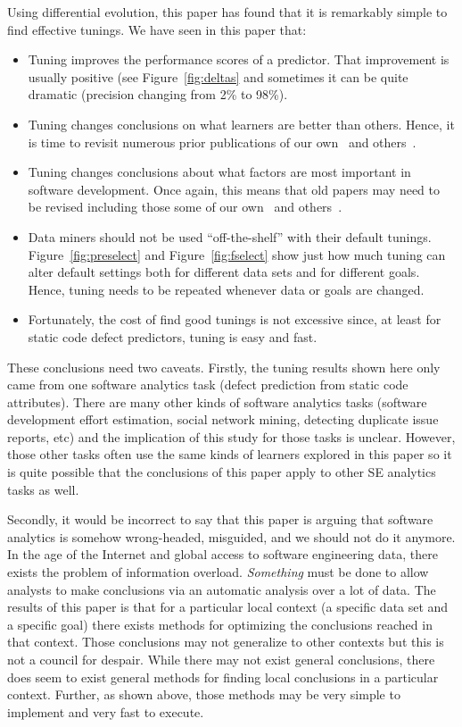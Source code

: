 \documentclass{sig-alternative}
\newcommand{\bi}{\begin{itemize}[leftmargin=0.4cm]}
\newcommand{\ei}{\end{itemize}}
\newcommand{\fig}[1]{Figure~\ref{fig:#1}}
\begin{document}
Using differential evolution, this paper has found that it is remarkably simple to find effective tunings. We have seen in this paper that:
\bi
\item
Tuning improves the performance scores of a predictor.
That improvement is usually positive (see \fig{deltas} and sometimes
it can be quite   dramatic (precision changing from 2\% to 98\%). 
\item Tuning changes conclusions on what learners are better than others.
Hence, it is time to revisit numerous prior publications of our own~\cite{me07b}
and others~\cite{lessmann2008benchmarking,hall11}.
\item
Tuning changes conclusions about what factors are most important in software development.
Once again, this means that old papers may need to be revised including those
some of our own~\cite{me02k} and others~\cite{bell2013limited,rahman2013how,moser2008comparative,zimmermann2007predicting,herzig2013predicting}. 
\item
Data miners should not be used ``off-the-shelf'' with their default tunings. 
\fig{preselect} and \fig{fselect}    show just how much tuning can alter default settings
both for different data sets and for different goals. Hence, tuning needs to be repeated
whenever data or goals are changed.
\item
Fortunately, the cost of find good tunings is not excessive since, at least for
static code defect predictors, tuning is easy and fast.
\ei
These conclusions need two caveats.
Firstly, the tuning results shown here only came from one  software analytics task 
(defect prediction from static code attributes).
There are many other kinds of software analytics tasks 
(software development effort estimation, social network mining,
detecting duplicate issue reports, etc) and the implication of this
study for those tasks is unclear. 
However,  those other tasks often use the same kinds of learners
explored in this paper so it is quite possible that
the conclusions of this paper apply to other SE analytics tasks as well. 

Secondly, it would be incorrect to say that this paper is arguing that
software analytics is somehow wrong-headed, misguided, and we should not do it anymore.
In the age of the Internet and global access to software engineering data,
there exists the  problem of information overload. {\em Something} must be done to
allow analysts to make conclusions via an automatic analysis over a lot of data.
The results of this paper is that for a particular local context
(a specific data set and a specific goal) there exists  
methods for optimizing the conclusions reached in that context.  
Those conclusions
may not generalize to other contexts but this  is not a council for despair. While there may
not exist general conclusions, there does seem to exist general methods for finding
local conclusions in a particular context. Further, as shown above, those
methods may be very simple to implement and very fast to execute.
\end{document}
